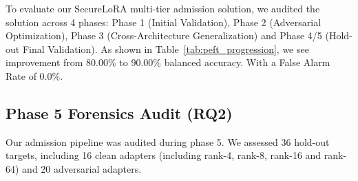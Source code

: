 To evaluate our SecureLoRA multi-tier admission solution, we audited the solution across 4 phases: Phase 1 (Initial Validation), Phase 2 (Adversarial Optimization), Phase 3 (Cross-Architecture Generalization) and Phase 4/5 (Hold-out Final Validation). As shown in Table~\ref{tab:peft_progression}, we see improvement from 80.00\% to 90.00\% balanced accuracy. With a False Alarm Rate of 0.0\%.

\begin{table}[t]
\centering
\caption{9 Zero-Reference Detection Paradigms Tested on Real Models}
\centering
\caption{Performance Across Physical \& Functional PEFT Targets}
\label{tab:peft_progression}
\end{table}

\subsection{Phase 5 Forensics Audit (RQ2)}
\label{subsec:exp_phase5}

Our admission pipeline was audited during phase 5. We assessed 36 hold-out targets, including 16 clean adapters (including rank-4, rank-8, rank-16 and rank-64) and 20 adversarial adapters.


